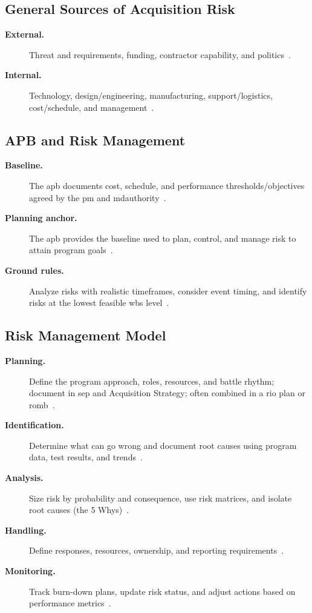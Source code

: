\documentclass[../main.tex]{subfiles}
\begin{document}
\subsection{General Sources of Acquisition Risk}
\begin{description}
  \item[\textbf{External.}] Threat and requirements, funding, contractor capability, and politics~\autocite{edo-3-3-6-risk-management-problem-solving-2025}.
  \item[\textbf{Internal.}] Technology, design/engineering, manufacturing, support/logistics, cost/schedule, and management~\autocite{edo-3-3-6-risk-management-problem-solving-2025}.
\end{description}

\subsection{APB and Risk Management}
\begin{description}
  \item[\textbf{Baseline.}] The \ac{apb} documents cost, schedule, and performance thresholds/objectives agreed by the \ac{pm} and \ac{mdauthority}~\autocite{edo-3-3-6-risk-management-problem-solving-2025}.
  \item[\textbf{Planning anchor.}] The \ac{apb} provides the baseline used to plan, control, and manage risk to attain program goals~\autocite{edo-3-3-6-risk-management-problem-solving-2025}.
  \item[\textbf{Ground rules.}] Analyze risks with realistic timeframes, consider event timing, and identify risks at the lowest feasible \ac{wbs} level~\autocite{edo-3-3-6-risk-management-problem-solving-2025}.
\end{description}

\subsection{Risk Management Model}
\begin{description}
  \item[\textbf{Planning.}] Define the program approach, roles, resources, and battle rhythm; document in \ac{sep} and Acquisition Strategy; often combined in a \ac{rio} plan or \ac{romb}~\autocite{edo-3-3-6-risk-management-problem-solving-2025}.
  \item[\textbf{Identification.}] Determine what can go wrong and document root causes using program data, test results, and trends~\autocite{edo-3-3-6-risk-management-problem-solving-2025}.
  \item[\textbf{Analysis.}] Size risk by probability and consequence, use risk matrices, and isolate root causes (the 5 Whys)~\autocite{edo-3-3-6-risk-management-problem-solving-2025}.
  \item[\textbf{Handling.}] Define responses, resources, ownership, and reporting requirements~\autocite{edo-3-3-6-risk-management-problem-solving-2025}.
  \item[\textbf{Monitoring.}] Track burn-down plans, update risk status, and adjust actions based on performance metrics~\autocite{edo-3-3-6-risk-management-problem-solving-2025}.
\end{description}
\end{document}
